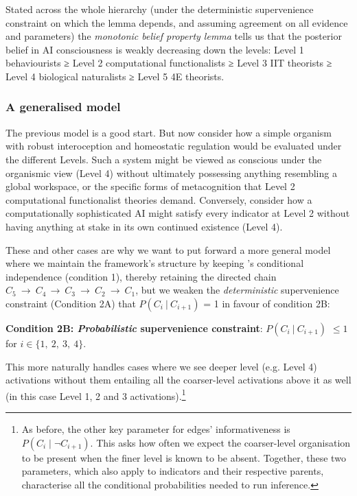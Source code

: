 \documentclass[11pt, a4paper, onecolumn, gdm]{google}
\begin{document}
Stated across the whole hierarchy (under the deterministic supervenience constraint on which the lemma depends, and assuming agreement on all evidence and parameters) the \emph{monotonic belief property lemma} tells us that the posterior belief in AI consciousness is weakly decreasing down the levels: Level 1 behaviourists ≥ Level 2 computational functionalists ≥ Level 3 IIT theorists ≥ Level 4 biological naturalists ≥ Level 5 4E theorists.

\subsubsection{A generalised model}\label{a-generalised-model}

The previous model is a good start.
But now consider how a simple organism with robust interoception and homeostatic regulation would be evaluated under the different Levels.
Such a system might be viewed as conscious under the organismic view (Level 4) without ultimately possessing anything resembling a global workspace, or the specific forms of metacognition that Level 2 computational functionalist theories demand.
Conversely, consider how a computationally sophisticated AI might satisfy every indicator at Level 2 without having anything at stake in its own continued existence (Level 4).

These and other cases are why we want to put forward a more general model where we maintain the framework's structure by keeping 's conditional independence (condition 1), thereby retaining the directed chain \(C_{5}\ \rightarrow \ C_{4\ } \rightarrow \ C_{3}\ \rightarrow \ C_{2}\ \rightarrow \ C_{1}\), but we weaken the \emph{deterministic} supervenience constraint (Condition 2A) that \(P(C_{i}\ |\ C_{i + 1})\) = 1 in favour of condition 2B:

\textbf{Condition 2B: \emph{Probabilistic} supervenience constraint}: \(P(C_{i}\ |\ C_{i + 1})\) \(\leq 1\) for \(i \in \{ 1,\ 2,\ 3,\ 4\}.\)

This more naturally handles cases where we see deeper level (e.g. Level 4) activations without them entailing all the coarser-level activations above it as well (in this case Level 1, 2 and 3 activations).\footnote{As before, the other key parameter for edges' informativeness is \(P(C_{i} \mid \lnot C_{i+1})\). This asks how often we expect the coarser-level organisation to be present when the finer level is known to be absent. Together, these two parameters, which also apply to indicators and their respective parents, characterise all the conditional probabilities needed to run inference.}
\end{document}
